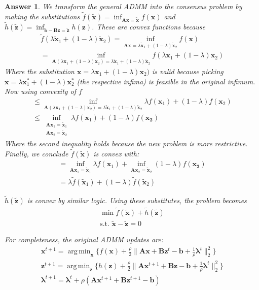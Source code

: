 \documentclass[12pt]{article}
\DeclareMathOperator*{\argmin}{arg\,min}
\theoremstyle{colon}
\newtheorem*{answer}{Answer}
\begin{document}
\begin{answer}
	We transform the general ADMM into the consensus problem by making the substitutions $\tilde{f}(\tilde{\bm{x}}) = \inf_{\bm{A}\bm{x} = \tilde{\bm{x}}} f(\bm{x})$ and $\tilde{h}(\tilde{\bm{z}}) = \inf_{\bm{b} - \bm{B}\bm{z} = \tilde{\bm{z}}} h(\bm{z})$. These are convex functions because
	\begin{gather*}
		\tilde{f}(\lambda \tilde{\bm{x}}_1 + (1-\lambda) \tilde{\bm{x}}_2) = \inf_{\bm{A}\bm{x} = \lambda \tilde{\bm{x}}_1 + (1-\lambda) \tilde{\bm{x}}_2} f(\bm{x}) \\ 
		= \inf_{\bm{A}(\lambda \bm{x}_1 + (1-\lambda) \bm{x}_2) = \lambda \tilde{\bm{x}}_1 + (1-\lambda) \tilde{\bm{x}}_2} f(\lambda \bm{x}_1 + (1-\lambda) \bm{x}_2)
	\end{gather*}
	Where the substitution $\bm{x} = \lambda \bm{x}_1 + (1-\lambda) \bm{x}_2)$ is valid because picking $\bm{x} = \lambda \bm{x}_1^* + (1-\lambda) \bm{x}_2^*$ (the respective infima) is feasible in the original infimum. Now using convexity of $f$
	\begin{gather*}
		\leq \inf_{\bm{A}(\lambda \bm{x}_1 + (1-\lambda) \bm{x}_2) = \lambda \tilde{\bm{x}}_1 + (1-\lambda) \tilde{\bm{x}}_2} \lambda f(\bm{x}_1) + (1-\lambda) f(\bm{x}_2) \\
		\leq \inf_{\substack{\bm{A} \bm{x}_1 = \tilde{\bm{x}}_1 \\ \bm{A} \bm{x}_2 = \tilde{\bm{x}}_2}} \lambda f(\bm{x}_1) + (1-\lambda) f(\bm{x_2})
	\end{gather*}
	Where the second inequality holds because the new problem is more restrictive. Finally, we conclude $\tilde{f}(\tilde{\bm{x}})$ is convex with:
	\begin{gather*}
		= \inf_{\bm{A} \bm{x}_1 = \tilde{\bm{x}}_1} \lambda f(\bm{x}_1) + \inf_{\bm{A} \bm{x}_2 = \tilde{\bm{x}}_2}  (1-\lambda) f(\bm{x_2}) \\
		= \lambda \tilde{f}(\tilde{\bm{x}}_1) + (1-\lambda) \tilde{f}(\tilde{\bm{x}}_2)
	\end{gather*}

	$\tilde{h}(\tilde{\bm{z}})$ is convex by similar logic. Using these substitutes, the problem becomes
	\begin{gather*}
		\min \tilde{f}(\tilde{\bm{x}}) + \tilde{h}(\tilde{\bm{z}}) \\
		\text{s.t. } \tilde{\bm{x}} - \tilde{\bm{z}} = 0
	\end{gather*}

	For completeness, the original ADMM updates are:
	\begin{gather*}
		\bm{x}^{t+1} = \argmin_{\bm{x}} \{ f(\bm{x}) + \frac{\rho}{2} \lVert \bm{A} \bm{x} + \bm{B} \bm{z}^t - \bm{b} + \frac{1}{\rho} \bm{\lambda}^t \rVert_2^2 \} \\
		\bm{z}^{t+1} = \argmin_{\bm{z}} \{ h(\bm{z}) + \frac{\rho}{2} \lVert \bm{A} \bm{x}^{t+1} + \bm{B} \bm{z} - \bm{b} + \frac{1}{\rho} \bm{\lambda}^t \rVert_2^2 \} \\
		\bm{\lambda}^{t+1} = \bm{\lambda}^t + \rho (\bm{A} \bm{x}^{t+1} + \bm{B} \bm{z}^{t+1} - \bm{b})
	\end{gather*}


\end{answer}
\end{document}

